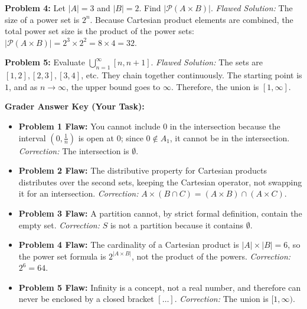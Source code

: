 \documentclass[12pt]{article}
\begin{document}
\textbf{Problem 4:} Let $|A| = 3$ and $|B| = 2$. Find $|\mathcal{P}(A \times B)|$.
\textit{Flawed Solution:} The size of a power set is $2^n$. Because Cartesian product elements are combined, the total power set size is the product of the power sets: $|\mathcal{P}(A \times B)| = 2^3 \times 2^2 = 8 \times 4 = 32$.

\textbf{Problem 5:} Evaluate $\bigcup_{n=1}^\infty [n, n+1]$.
\textit{Flawed Solution:} The sets are $[1, 2], [2, 3], [3, 4]$, etc. They chain together continuously. The starting point is $1$, and as $n \to \infty$, the upper bound goes to $\infty$. Therefore, the union is $[1, \infty]$.

\vspace{1cm}
\hrulefill
\vspace{0.5cm}

\textbf{\Large Grader Answer Key (Your Task):}
\begin{itemize}
    \item \textbf{Problem 1 Flaw:} You cannot include $0$ in the intersection because the interval $(0, \frac{1}{n})$ is open at $0$; since $0 \notin A_1$, it cannot be in the intersection. \textit{Correction:} The intersection is $\emptyset$.
    \item \textbf{Problem 2 Flaw:} The distributive property for Cartesian products distributes over the second sets, keeping the Cartesian operator, not swapping it for an intersection. \textit{Correction:} $A \times (B \cap C) = (A \times B) \cap (A \times C)$.
    \item \textbf{Problem 3 Flaw:} A partition cannot, by strict formal definition, contain the empty set. \textit{Correction:} $S$ is not a partition because it contains $\emptyset$.
    \item \textbf{Problem 4 Flaw:} The cardinality of a Cartesian product is $|A| \times |B| = 6$, so the power set formula is $2^{|A \times B|}$, not the product of the powers. \textit{Correction:} $2^6 = 64$.
    \item \textbf{Problem 5 Flaw:} Infinity is a concept, not a real number, and therefore can never be enclosed by a closed bracket $[ \dots ]$. \textit{Correction:} The union is $[1, \infty)$.
\end{itemize}
\end{document}
